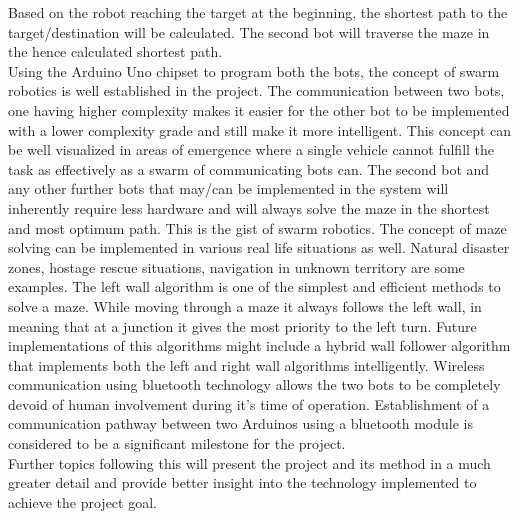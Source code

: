 Based on the robot reaching the target at the beginning, the shortest path to the target/destination will be calculated. The second bot will traverse the maze in the hence calculated shortest path.\\
Using the Arduino Uno chipset to program both the bots, the concept of swarm  robotics is well established in the project. The communication between two bots, one having higher complexity makes it easier for the other bot to be implemented with a lower complexity grade and still make it more intelligent. This concept can be well visualized in areas of emergence where a single vehicle cannot fulfill the task as effectively as a swarm of communicating bots can. The second bot and any other further bots that may/can be implemented in the system will inherently require less hardware and will always solve the maze in the shortest and most optimum path. This is the gist of swarm robotics. 
The concept of maze solving can be implemented in various real life situations as well. Natural disaster zones, hostage rescue situations, navigation in unknown territory are some examples. The left wall algorithm is one of the simplest and efficient methods to solve a maze. While moving through a maze it always follows the left wall, in meaning that at a junction it gives the most priority to the left turn. Future implementations of this algorithms might include a hybrid wall follower algorithm that implements both the left and right wall algorithms intelligently. Wireless communication using bluetooth technology allows the two bots to be completely devoid of human involvement during it's time of operation. Establishment of a communication pathway between two Arduinos using a bluetooth module is considered to be a significant milestone for the project. \\
Further topics following this will present the project and its method in a much greater detail and provide better insight into the technology implemented to achieve the project goal.

